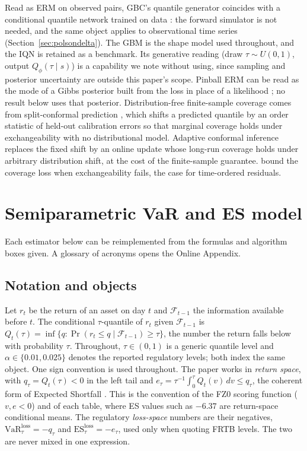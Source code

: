 \documentclass[11pt]{article}
\newcommand{\VaR}{\mathrm{VaR}}
\newcommand{\ES}{\mathrm{ES}}
\theoremstyle{remark}
\begin{document}
Read as ERM on observed pairs, GBC's quantile generator coincides
with a conditional quantile network trained on data
\citep{dabney2018iqn, koenker1978}: the forward simulator is not needed,
and the same object applies to observational time series
(Section~\ref{sec:polsondelta}). The GBM is the shape model used
throughout, and the IQN is retained as a benchmark. Its generative reading (draw $\tau \sim
U(0,1)$, output $Q_\phi(\tau \mid s)$) is a capability we note
without using, since sampling and posterior uncertainty are outside
this paper's scope. Pinball ERM can be read as the mode of a Gibbs posterior built from the loss in place of a likelihood \citep{jiang2008gibbs, bissiri2016general}; no result below uses that posterior. Distribution-free finite-sample coverage comes from split-conformal prediction \citep{vovk2005, lei2018, romano2019cqr}, which shifts a predicted quantile by an order statistic of held-out calibration errors so that marginal coverage holds under exchangeability with no distributional model. Adaptive conformal inference \citep{gibbs2021aci} replaces the fixed shift by an online update whose long-run coverage holds under arbitrary distribution shift, at the cost of the finite-sample guarantee. \citet{barber2023} bound the coverage loss when exchangeability fails, the case for time-ordered residuals.

\section{Semiparametric VaR and ES model}\label{sec:methods}

Each estimator below can be reimplemented from the formulas and
algorithm boxes given. A glossary of acronyms opens the Online
Appendix.

\subsection{Notation and objects}\label{sec:notation}

Let $r_t$ be the return of an asset on day $t$ and $\mathcal{F}_{t-1}$ the information available before $t$. The conditional $\tau$-quantile of $r_t$ given $\mathcal{F}_{t-1}$ is $Q_t(\tau) = \inf\{q : \Pr(r_t \le q \mid \mathcal{F}_{t-1}) \ge \tau\}$, the number the return falls below with probability $\tau$. Throughout, $\tau\in(0,1)$ is a generic quantile level and $\alpha\in\{0.01,0.025\}$ denotes the reported regulatory levels; both index the same object. One sign convention is used throughout. The paper works in \emph{return space}, with $q_\tau = Q_t(\tau) < 0$ in the left tail and $e_\tau = \tau^{-1}\int_0^{\tau} Q_t(v)\,dv \le q_\tau$, the coherent form of Expected Shortfall \citep{artzner1999, acerbitasche2002}. This is the convention of the FZ0 scoring function ($v,e<0$) \citep{fissler2016, patton2019} and of each table, where ES values such as $-6.37$ are return-space conditional means. The regulatory \emph{loss-space} numbers are their negatives, $\VaR^{\mathrm{loss}}_\tau=-q_\tau$ and $\ES^{\mathrm{loss}}_\tau=-e_\tau$, used only when quoting FRTB levels. The two are never mixed in one expression.
\end{document}
